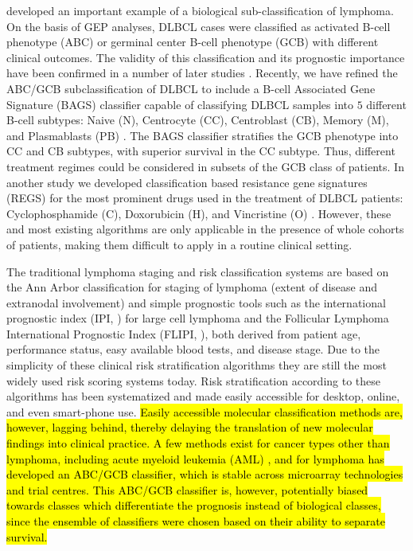 \documentclass{article}
\begin{document}
\citet{Alizadeh2000} developed an important example of a biological sub-classification of lymphoma.
On the basis of GEP analyses, DLBCL cases were classified as activated B-cell phenotype (ABC) or germinal center B-cell phenotype (GCB) with different clinical outcomes.
The validity of this classification and its prognostic importance have been confirmed in a number of later studies \citep{Rosenwald2002a,Hans2004,Poulsen2005,Lenz2008a,Monti2012a}.
Recently, we have refined the ABC/GCB subclassification of DLBCL to include a B-cell Associated Gene Signature (BAGS) classifier capable of classifying DLBCL samples into $5$ different B-cell subtypes:
Naive (N), Centrocyte (CC), Centroblast (CB), Memory (M), and Plasmablasts (PB) \citep{DybkaerBoegsted2015}.
The BAGS classifier stratifies the GCB phenotype into CC and CB subtypes, with superior survival in the CC subtype. Thus, different treatment regimes could be considered in subsets of the GCB class of patients.
In another study we developed classification based resistance gene signatures (REGS) for the most prominent drugs used in the treatment of DLBCL patients:
Cyclophosphamide (C), Doxorubicin (H), and Vincristine (O) \citep{Falgreen2015}.
However, these and most existing algorithms are only applicable in the presence of whole cohorts of patients, making them difficult to apply in a routine clinical setting.

The traditional lymphoma staging and risk classification systems are based on the Ann Arbor classification for staging of lymphoma (extent of disease and extranodal involvement) and simple prognostic tools such as the international prognostic index (IPI, \citep{IPI}) for large cell lymphoma and the Follicular Lymphoma International Prognostic Index (FLIPI, \citep{FLIPI}), both derived from patient age, performance status, easy available blood tests, and disease stage.
Due to the simplicity of these clinical risk stratification algorithms they are still the most widely used risk scoring systems today.
Risk stratification according to these algorithms has been systematized and made easily accessible for desktop, online, and even smart-phone use.
\hl{Easily accessible molecular classification methods are, however, lagging behind, thereby delaying the translation of new molecular findings into clinical practice.
A few methods exist for cancer types other than lymphoma, including acute myeloid leukemia (AML) \mbox{\citep{Huang2009}}, and for lymphoma \mbox{\citet{Care2013}} has developed an ABC/GCB classifier, which is stable across microarray technologies and trial centres. This ABC/GCB classifier is, however, potentially biased towards classes which differentiate the prognosis instead of biological classes, since the ensemble of classifiers were chosen based on their ability to separate survival.}
\end{document}
